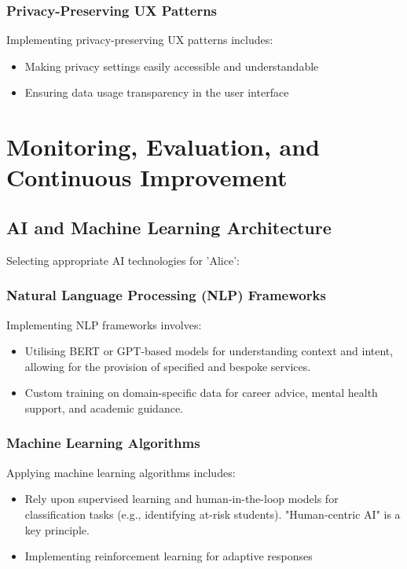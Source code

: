 \documentclass[15pt,a4paper]{article}
\begin{document}
\begin{multicols}{2}
\subsubsection*{Privacy-Preserving UX Patterns}
Implementing privacy-preserving UX patterns \textit{\parencite[pp. 50-100]{Hartzog2023}} includes:
\begin{itemize}
    \item Making privacy settings easily accessible and understandable
    \item Ensuring data usage transparency in the user interface
\end{itemize}

\section{Monitoring, Evaluation, and Continuous Improvement}
\subsection{AI and Machine Learning Architecture}
Selecting appropriate AI technologies for 'Alice':

\subsubsection*{Natural Language Processing (NLP) Frameworks}
Implementing NLP frameworks \textit{\parencite[pp. 1-15]{JurafskyMartin2024}} involves:
\begin{itemize}
    \item Utilising BERT or GPT-based models for understanding context and intent, allowing for the provision of specified and bespoke services.
    \item Custom training on domain-specific data for career advice, mental health support, and academic guidance.
\end{itemize}

\subsubsection*{Machine Learning Algorithms}
Applying machine learning algorithms \textit{\parencite[pp. 25-50]{Geron2024}} includes:
\begin{itemize}
    \item Rely upon supervised learning and human-in-the-loop models for classification tasks (e.g., identifying at-risk students). "Human-centric AI" is a key principle.
    \item Implementing reinforcement learning for adaptive responses
\end{itemize}



\end{multicols}
\end{document}
